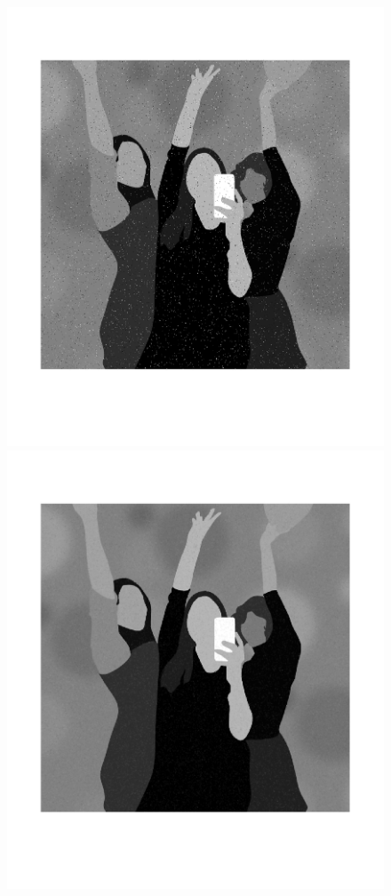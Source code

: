 \begin{figure}[htb] \centering
\includegraphics[scale=0.15,trim={0 3cm 0 5cm},clip]{Pictures/Esempi di utilizzo/Esempio 4/party_originale.png}
\includegraphics[scale=0.15,trim={0 3cm 0 5cm},clip]{Pictures/Esempi di utilizzo/Esempio 4/party_filtrata_kappa6.png}

\end{figure}
